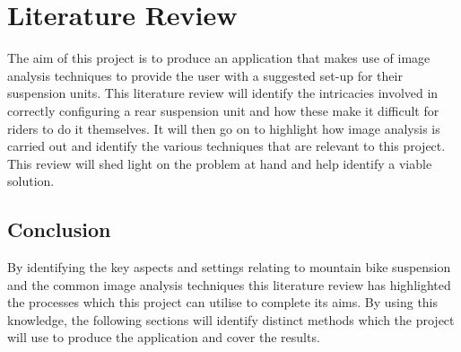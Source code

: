 \section{Literature Review}\label{sec:lit_review}
	The aim of this project is to produce an application that makes use of image analysis techniques to provide the user with a suggested set-up for their suspension units. This literature review will identify the intricacies involved in correctly configuring a rear suspension unit and how these make it difficult for riders to do it themselves. It will then go on to highlight how image analysis is carried out and identify the various techniques that are relevant to this project. This review will shed light on the problem at hand and help identify a viable solution.
	
	
	
	
	
	
	\subsection{Conclusion}
	By identifying the key aspects and settings relating to mountain bike suspension and the common image analysis techniques this literature review has highlighted the processes which this project can utilise to complete its aims. By using this knowledge, the following sections will identify distinct methods which the project will use to produce the application and cover the results. 
	\clearpage